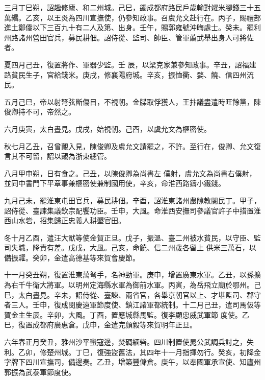 \begin{pinyinscope}
 三月丁巳朔，詔趣修廬、和二州城。己巳，蠲成都府路民戶歲輸對糴米腳錢三十五萬緡。乙亥，以王炎為四川宣撫使，仍參知政事。召虞允文赴行在。丙子，賜禮部進土鄭僑以下三百九十有二人及第、出身。壬午，賜郭雍號沖晦處士。癸未。罷利州路諸州營田官兵，募民耕佃。詔侍從、監司、帥臣、管軍薦武舉出身人可將佐者。



 夏四月己丑，復置將作、軍器少監。壬
 辰，以梁克家兼參知政事。辛丑，詔福建路貧民生子，官給錢米。庚戌，修襄陽府城。辛亥，振恤衢、婺、饒、信四州流民。



 五月己巳，帝以射弩弦斷傷目，不視朝。金牒取俘獲人，王抃議盡遣時旺餘黨，陳俊卿持不可，帝然之。



 六月庚寅，太白晝見。戊戌，始視朝。己酉，以虞允文為樞密使。



 秋七月乙丑，召曾覿入見，陳俊卿及虞允文請罷之，不許。至行在，俊卿、允文復言其不可留，詔以覿為浙東總管。



 八月甲申朔，日有食之。己丑，以陳俊卿為尚書左
 僕射，虞允文為尚書右僕射，並同中書門下平章事兼樞密使兼制國用使，辛亥，命淮西路鑄小鐵錢。



 九月己未，罷淮東屯田官兵，募民耕佃。辛酉，詔淮東諸州農隙教閱民丁。甲子，詔侍從、臺諫集議欽宗配饗功臣。壬申，大風。命淮西安撫司參議官許子中措置淮西山水砦，招集歸正忠義人耕墾官田。



 冬十月乙酉，遣汪大猷等使金賀正旦。戊子，振溫、臺二州被水貧民，以守臣、監司失職，降責有差。戊戌，大風。己亥，命饒、信二州歲各留上
 供米三萬石，以備振糶。癸卯，金遣高德基等來賀會慶節。



 十一月癸丑朔，復置淮東萬弩手，名神勁軍。庚申，增置廣東水軍。乙丑，以孫擴為右千牛衛大將軍。以明州定海縣水軍為御前水軍。丙寅，為岳飛立廟於鄂州。己巳，太白晝見。辛未，詔侍從、臺諫、兩省官，各舉京朝官以上、才堪監司、郡守者三人。壬申，復成閔慶遠軍節度使、鎮江諸軍都統制。十二月己丑，遣司馬伋等賀金主生辰。辛卯，大風。丁酉，置應城縣馬監。復李顯忠威武軍節
 度使。乙巳，復置成都府廣惠倉。戊申，金遣完顏毅等來賀明年正旦。



 六年春正月癸丑，雅州沙平蠻寇邊，焚碉緬砦。四川制置使晁公武調兵討之，失利。乙卯，修楚州城。丁巳，復強盜舊法，其四年十一月指揮勿行。癸亥，初降金字牌下四川宣撫司，備邊奏。乙丑，增築豐儲倉。庚午，以奉國軍承宣使、知廬州郭振為武泰軍節度使。




\end{pinyinscope}
